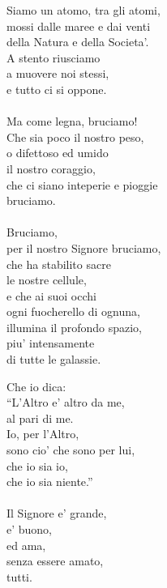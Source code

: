 \begin{haiku}
    Siamo un atomo, tra gli atomi,\\
    mossi dalle maree e dai venti \\
    della Natura e della Societa'.\\
    A stento riusciamo \\
    a muovere noi stessi,\\
    e tutto ci si oppone.\\
    \leavevmode\\
    Ma come legna, bruciamo!\\
    Che sia poco il nostro peso,\\
    o difettoso ed umido\\
    il nostro coraggio,\\
    che ci siano inteperie e pioggie\\
    bruciamo.\\
    \leavevmode\\
    Bruciamo, \\
    per il nostro Signore bruciamo,\\
    che ha stabilito sacre\\
    le nostre cellule,\\
    e che ai suoi occhi \\
    ogni fuocherello di ognuna,\\
    illumina il profondo spazio,\\
    piu' intensamente \\
    di tutte le galassie.\\
\end{haiku}

\begin{haiku}
    Che io dica: \\
    ``L'Altro e' altro da me,\\
    al pari di me.\\
    Io, per l'Altro,\\
    sono cio' che sono per lui,\\
    che io sia io,\\
    che io sia niente.''\\
    \leavevmode\\
    Il Signore e' grande,\\
    e' buono,\\
    ed ama, \\
    senza essere amato,\\
    tutti.\\
\end{haiku}

